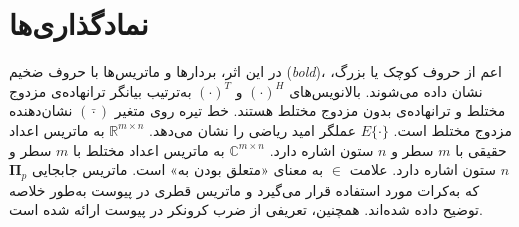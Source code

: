 \section{نمادگذاری‌ها}
\label{sec:1-3}

در این اثر، بردارها و ماتریس‌ها با حروف ضخیم (\textit{bold})، اعم از حروف کوچک یا بزرگ، نشان داده می‌شوند. بالانویس‌های $(\cdot)^H$ و $(\cdot)^T$ به‌ترتیب بیانگر ترانهاده‌ی مزدوج مختلط و ترانهاده‌ی بدون مزدوج مختلط هستند. خط تیره روی متغیر $(\bar{\cdot})$ نشان‌دهنده مزدوج مختلط است. $E\{\cdot\}$ عملگر امید ریاضی را نشان می‌دهد. $\mathbb{R}^{m \times n}$ به ماتریس اعداد حقیقی با $m$ سطر و $n$ ستون اشاره دارد. $\mathbb{C}^{m \times n}$ به ماتریس اعداد مختلط با $m$ سطر و $n$ ستون اشاره دارد. علامت $\in$ به معنای «متعلق بودن به» است. ماتریس جابجایی $\bm{\Pi}_p$ که به‌کرات مورد استفاده قرار می‌گیرد و ماتریس قطری در پیوست به‌طور خلاصه توضیح داده شده‌اند. همچنین، تعریفی از ضرب کرونکر در پیوست ارائه شده است.


























